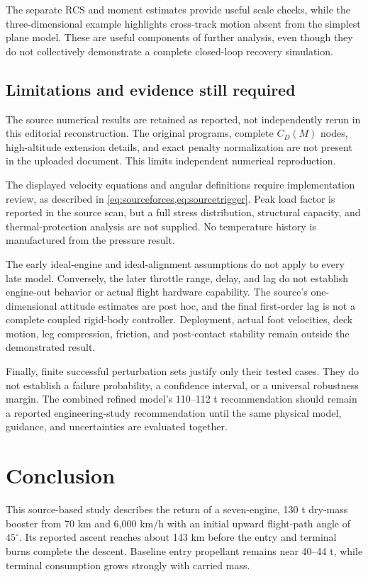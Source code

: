 \documentclass[11pt,a4paper]{article}
\begin{document}
The separate RCS and moment estimates provide useful scale checks, while the three-dimensional example highlights cross-track motion absent from the simplest plane model. These are useful components of further analysis, even though they do not collectively demonstrate a complete closed-loop recovery simulation.

\subsection{Limitations and evidence still required}
The source numerical results are retained as reported, not independently rerun in this editorial reconstruction. The original programs, complete $C_D(M)$ nodes, high-altitude extension details, and exact penalty normalization are not present in the uploaded document. This limits independent numerical reproduction.

The displayed velocity equations and angular definitions require implementation review, as described in \cref{eq:sourceforces,eq:sourcetrigger}. Peak load factor is reported in the source scan, but a full stress distribution, structural capacity, and thermal-protection analysis are not supplied. No temperature history is manufactured from the pressure result.

The early ideal-engine and ideal-alignment assumptions do not apply to every late model. Conversely, the later throttle range, delay, and lag do not establish engine-out behavior or actual flight hardware capability. The source's one-dimensional attitude estimates are post hoc, and the final first-order lag is not a complete coupled rigid-body controller. Deployment, actual foot velocities, deck motion, leg compression, friction, and post-contact stability remain outside the demonstrated result.

Finally, finite successful perturbation sets justify only their tested cases. They do not establish a failure probability, a confidence interval, or a universal robustness margin. The combined refined model's 110--112 t recommendation should remain a reported engineering-study recommendation until the same physical model, guidance, and uncertainties are evaluated together.

\section{Conclusion}
This source-based study describes the return of a seven-engine, 130 t dry-mass booster from 70 km and 6,000 km/h with an initial upward flight-path angle of $45^\circ$. Its reported ascent reaches about 143 km before the entry and terminal burns complete the descent. Baseline entry propellant remains near 40--44 t, while terminal consumption grows strongly with carried mass.
\end{document}
